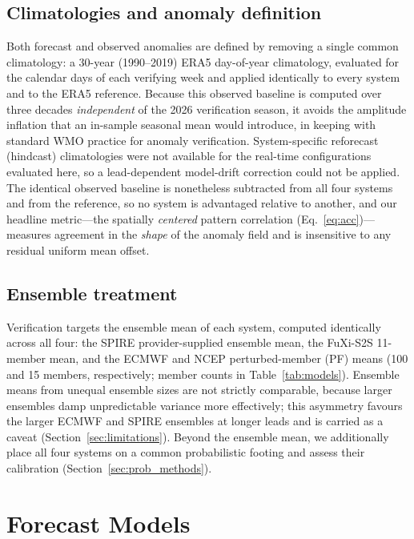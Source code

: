 \documentclass[11pt]{article}
\begin{document}
\subsection{Climatologies and anomaly definition}\label{sec:anom}

Both forecast and observed anomalies are defined by removing a single
common climatology: a 30-year (1990--2019) ERA5 day-of-year climatology,
evaluated for the calendar days of each verifying week and applied
identically to every system and to the ERA5 reference. Because this
observed baseline is computed over three decades \emph{independent} of
the 2026 verification season, it avoids the amplitude inflation that an
in-sample seasonal mean would introduce, in keeping with standard WMO
practice for anomaly verification. System-specific reforecast (hindcast)
climatologies were not available for the real-time configurations
evaluated here, so a lead-dependent model-drift correction could not be
applied. The identical observed baseline is nonetheless subtracted from
all four systems and from the reference, so no system is advantaged
relative to another, and our headline metric---the spatially
\emph{centered} pattern correlation (Eq.~\ref{eq:acc})---measures
agreement in the \emph{shape} of the anomaly field and is insensitive to
any residual uniform mean offset.

\subsection{Ensemble treatment}\label{sec:ens}

Verification targets the ensemble mean of each system, computed
identically across all four: the SPIRE provider-supplied ensemble mean,
the FuXi-S2S 11-member mean, and the ECMWF and NCEP perturbed-member
(PF) means (100 and 15 members, respectively; member counts in
Table~\ref{tab:models}). Ensemble means from unequal ensemble sizes are
not strictly comparable, because larger ensembles damp unpredictable
variance more effectively; this asymmetry favours the larger ECMWF and
SPIRE ensembles at longer leads and is carried as a caveat
(Section~\ref{sec:limitations}). Beyond the ensemble mean, we
additionally place all four systems on a common probabilistic footing
and assess their calibration (Section~\ref{sec:prob_methods}).

\section{Forecast Models}\label{sec:models}
\end{document}
